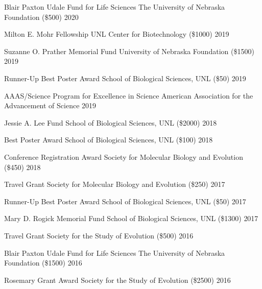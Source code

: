
\begin{cvhonors}

  \cvhonor
    {Blair Paxton Udale Fund for Life Sciences}
    {The University of Nebraska Foundation (\$500)}
    {2020}

  \cvhonor
    {Milton E. Mohr Fellowship}
    {UNL Center for Biotechnology (\$1000)}
    {2019}

  \cvhonor
    {Suzanne O. Prather Memorial Fund}
    {University of Nebraska Foundation (\$1500)}
    {2019}

  \cvhonor
    {Runner-Up Best Poster Award}
    {School of Biological Sciences, UNL (\$50)}
    {2019}

  \cvhonor
    {AAAS/Science Program for Excellence in Science}
    {American Association for the Advancement of Science}
    {2019}

  \cvhonor
    {Jessie A. Lee Fund} 
    {School of Biological Sciences, UNL (\$2000)}
    {2018} %

  \cvhonor
    {Best Poster Award}
    {School of Biological Sciences, UNL (\$100)}
    {2018}

  \cvhonor
    {Conference Registration Award}
    {Society for Molecular Biology and Evolution (\$450)}
    {2018}

  \cvhonor
    {Travel Grant}
    {Society for Molecular Biology and Evolution (\$250)}
    {2017}

  \cvhonor
    {Runner-Up Best Poster Award}
    {School of Biological Sciences, UNL (\$50)}
    {2017}

  \cvhonor
    {Mary D. Rogick Memorial Fund}
    {School of Biological Sciences, UNL (\$1300)}
    {2017}

  \cvhonor
    {Travel Grant}
    {Society for the Study of Evolution (\$500)}
    {2016}

  \cvhonor
    {Blair Paxton Udale Fund for Life Sciences}
    {The University of Nebraska Foundation (\$1500)}
    {2016}

  \cvhonor
    {Rosemary Grant Award}
    {Society for the Study of Evolution (\$2500)}
    {2016}


\end{cvhonors}
